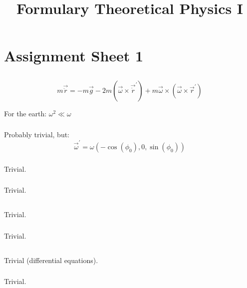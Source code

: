 \documentclass{report}
\title{Formulary Theoretical Physics I}
\begin{document}
\chapter{Assignment Sheet 1}

\section{}

\subsection{}
$$m\vec{\ddot{r}}=-m\vec{g}-2m(\vec{\omega}\times\vec{\dot{r}}^{'})+m\vec{\omega}\times(\vec{\omega}\times\vec{r}^{'})$$

For the earth: $\omega^2 \ll \omega$
\subsection{}
Probably trivial, but:
$$\vec{\omega}^{'}=\omega (-\cos(\phi_0),0,\sin(\phi_0))$$
\subsection{}
Trivial.
\subsection{}
Trivial.
\section{}

\subsection{}
Trivial.
\subsection{}
Trivial.
\section{}

\subsection{}
Trivial (differential equations).
\subsection{}
Trivial.
\end{document}
